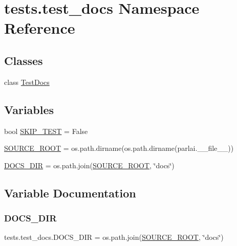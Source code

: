 \hypertarget{namespacetests_1_1test__docs}{}\section{tests.\+test\+\_\+docs Namespace Reference}
\label{namespacetests_1_1test__docs}
\subsection*{Classes}
\begin{DoxyCompactItemize}
\item 
class \hyperlink{classtests_1_1test__docs_1_1TestDocs}{Test\+Docs}
\end{DoxyCompactItemize}
\subsection*{Variables}
\begin{DoxyCompactItemize}
\item 
bool \hyperlink{namespacetests_1_1test__docs_a108de87d5d7455e720b4e6bdd3ac9257}{S\+K\+I\+P\+\_\+\+T\+E\+ST} = False
\item 
\hyperlink{namespacetests_1_1test__docs_a2ede9a57e3255e9217c239edda5271b6}{S\+O\+U\+R\+C\+E\+\_\+\+R\+O\+OT} = os.\+path.\+dirname(os.\+path.\+dirname(parlai.\+\_\+\+\_\+file\+\_\+\+\_\+))
\item 
\hyperlink{namespacetests_1_1test__docs_aa63f964d4d882c6489439dcfd69daf54}{D\+O\+C\+S\+\_\+\+D\+IR} = os.\+path.\+join(\hyperlink{namespacetests_1_1test__docs_a2ede9a57e3255e9217c239edda5271b6}{S\+O\+U\+R\+C\+E\+\_\+\+R\+O\+OT}, \char`\"{}docs\char`\"{})
\end{DoxyCompactItemize}


\subsection{Variable Documentation}
\mbox{\label{namespacetests_1_1test__docs_aa63f964d4d882c6489439dcfd69daf54}} 
\subsubsection{\texorpdfstring{D\+O\+C\+S\+\_\+\+D\+IR}{DOCS\_DIR}}
{\footnotesize\ttfamily tests.\+test\+\_\+docs.\+D\+O\+C\+S\+\_\+\+D\+IR = os.\+path.\+join(\hyperlink{namespacetests_1_1test__docs_a2ede9a57e3255e9217c239edda5271b6}{S\+O\+U\+R\+C\+E\+\_\+\+R\+O\+OT}, \char`\"{}docs\char`\"{})}

